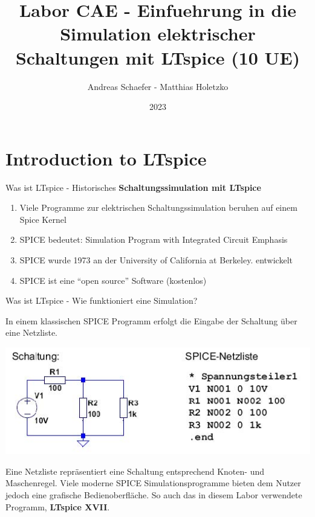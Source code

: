 \documentclass{beamer}
\title{Labor CAE - Einfuehrung in die Simulation elektrischer
Schaltungen mit LTspice (10 UE)}
\date{2023}
\author{Andreas Schaefer - Matthias Holetzko}
\institute{Duale Hochschule Baden-Württemberg  \newline -- \newline Fakultät Technik \newline Studiengang Mechatronik}
\begin{document}
\maketitle
\section{Introduction to LTspice}

\begin{frame}{Was ist LTspice - Historisches}
  \textbf{Schaltungssimulation mit LTspice}\newline
  \begin{enumerate}
    \item Viele Programme zur elektrischen Schaltungssimulation beruhen auf einem Spice Kernel
    \item SPICE bedeutet: Simulation Program with Integrated Circuit Emphasis
    \item SPICE wurde 1973 an der University of California at Berkeley. entwickelt
    \item SPICE ist eine “open source” Software (kostenlos)
  \end{enumerate}
\end{frame}

\begin{frame}[fragile]{Was ist LTspice - Wie funktioniert eine Simulation?}

  In einem klassischen SPICE Programm erfolgt die Eingabe der Schaltung über eine
  Netzliste.
  \begin{center}
    \includegraphics[scale=0.5]{pictures/page1.jpg}
  \end{center}

  Eine Netzliste repräsentiert eine Schaltung entsprechend Knoten- und Maschenregel. \newline Viele moderne SPICE Simulationsprogramme
  bieten dem Nutzer jedoch eine grafische Bedienoberfläche.
  So auch das in diesem Labor verwendete Programm, \textbf{LTspice XVII}.


\end{frame}
\end{document}
